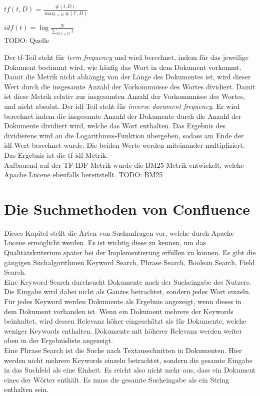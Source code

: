 \(tf(t,D)=\frac {\#(t,D)}{\max _{t'\in D}\#(t',D)}\)

\(idf(t)=\log {\frac {N}{\sum_{D:t\in D}1}}\)\\

TODO: Quelle

Der tf-Teil steht für \textit{term frequency} und wird berechnet, indem für das jeweilige Dokument bestimmt wird, wie häufig das Wort in dem Dokument vorkommt.
Damit die Metrik nicht abhängig von der Länge des Dokumentes ist, wird dieser Wert durch die insgesamte Anzahl der Vorkommnisse des Wortes dividiert.
Damit ist diese Metrik relativ zur insgesamten Anzahl der Vorkommnisse des Wortes, und nicht absolut.
Der idf-Teil steht für \textit{inverse document frequency}.
Er wird berechnet indem die insgesamte Anzahl der Dokumente durch die Anzahl der Dokumente dividiert wird, welche das Wort enthalten.
Das Ergebnis des dividierens wird an die Logarithmus-Funktion übergeben, sodass am Ende der idf-Wert berechnet wurde.
Die beiden Werte werden miteinander multipliziert.
Das Ergebnis ist die tf-idf-Metrik.\\

Aufbauend auf der TF-IDF Metrik wurde die BM25 Metrik entwickelt, welche Apache Lucene ebenfalls bereitstellt.
TODO: BM25


\section{Die Suchmethoden von Confluence}
Dieses Kapitel stellt die Arten von Suchanfragen vor, welche durch Apache Lucene ermöglicht werden.
Es ist wichtig diese zu kennen, um das Qualitätskriterium später bei der Implementierung erfüllen zu können.
Es gibt die gängigen Suchalgorithmen Keyword Search, Phrase Search, Boolean Search, Field Search.\\

Eine Keyword Search durchsucht Dokumente nach der Sucheingabe des Nutzers.
Die Eingabe wird dabei nicht als Ganzes betrachtet, sondern jedes Wort einzeln.
Für jedes Keyword werden Dokumente als Ergebnis angezeigt, wenn dieses in dem Dokument vorhanden ist.
Wenn ein Dokument mehrere der Keywords beinhaltet, wird dessen Relevanz höher eingeschätzt als für Dokumente, welche weniger Keywords enthalten.
Dokumente mit höherer Relevanz werden weiter oben in der Ergebnisliste angezeigt.\\

Eine Phrase Search ist die Suche nach Textausschnitten in Dokumenten.
Hier werden nicht mehrere Keywords einzeln betrachtet, sondern die gesamte Eingabe in das Suchfeld als eine Einheit.
Es reicht also nicht mehr aus, dass ein Dokument eines der Wörter enthält.
Es muss die gesamte Sucheingabe als ein String enthalten sein.\\

